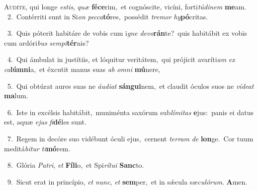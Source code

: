 \lettrine{\initial\textcolor{\initialcolor}{A}}{udíte,} qui longe \textit{es}\-\textit{tis}, \textit{quæ} \textbf{fé}\-\textbf{ce}rim,~\star et cognóscite, vicíni, forti\-\textit{tú}\-\textit{di}\textit{nem} \textbf{me}\-am.\\
{\numbfont\textcolor{\numbcolor}{~2.}}~Contérriti sunt in Si\textit{on} \textit{pec}\-\textit{ca}\textbf{tó}res,~\star possédit \textit{tre}\-\textit{mor} \textit{hy}\-\textbf{pó}critas.\par
{\numbfont\textcolor{\numbcolor}{~3.}}~Quis póterit habitáre de vobis cum i\textit{gne} \textit{de}\-\textit{vo}\textbf{rán}te?~\star quis habitábit ex vobis cum ardóri\textit{bus} \textit{sem}\-\textit{pi}\textbf{tér}nis?\par
{\numbfont\textcolor{\numbcolor}{~4.}}~Qui ámbulat in justítiis, et lóquitur veritátem,~\dagger qui prójicit avaríti\textit{am} \textit{ex} \textit{ca}\-\textbf{lúm}\textbf{ni}a,~\star et éxcutit manus suas \textit{ab} \textit{om}\-\textit{ni} \textbf{mú}\-nere,\par
{\numbfont\textcolor{\numbcolor}{~5.}}~Qui obtúrat aures suas ne \textit{áu}\-\textit{di}\textit{at} \textbf{sán}\-\textbf{gui}nem,~\star et claudit óculos suos ne \textit{ví}\-\textit{de}\textit{at} \textbf{ma}\-lum.\par
{\numbfont\textcolor{\numbcolor}{~6.}}~Iste in excélsis habitábit,~\dagger muniménta saxórum sub\-\textit{lí}\-\textit{mi}\textit{tas} \textbf{e}\-jus:~\star panis ei datus est, aquæ \textit{e}\-\textit{jus} \textit{fi}\-\textbf{dé}les sunt.\par
{\numbfont\textcolor{\numbcolor}{~7.}}~Regem in decóre suo vidébunt óculi ejus,~\dagger cernent \textit{ter}\-\textit{ram} \textit{de} \textbf{lon}\-ge.~\star Cor tuum meditá\-\textit{bi}\-\textit{tur} \textit{ti}\-\textbf{mó}rem.\par
{\numbfont\textcolor{\numbcolor}{~8.}}~Glória \textit{Pa}\-\textit{tri}, \textit{et} \textbf{Fí}\-\textbf{li}o,~\star et Spi\-\textit{rí}\-\textit{tu}\textit{i} \textbf{Sanc}\-to.\par
{\numbfont\textcolor{\numbcolor}{~9.}}~Sicut erat in princípio, \textit{et} \textit{nunc}\-, \textit{et} \textbf{sem}\-per,~\star et in sǽcula sæ\-\textit{cu}\-\textit{ló}\textit{rum}. \textbf{A}\-men.\par
